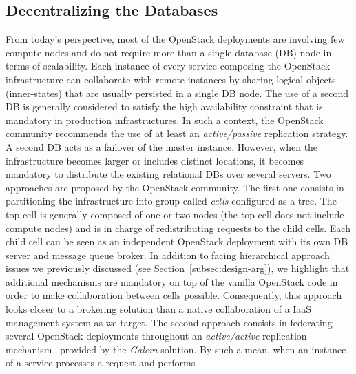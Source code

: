 \subsection{Decentralizing the Databases}


From today's perspective, most of the OpenStack deployments are involving few compute nodes and do not require more than a single database (DB) node
in terms of scalability. Each instance of every service composing the OpenStack infrastructure can collaborate with remote instances by sharing
logical objects (inner-states) that are usually persisted in a single DB node.
The use of a second DB is generally considered to satisfy the high availability constraint that is mandatory in production infrastructures. In such a
context, the OpenStack community recommends the use of at least an \textit{active/passive} replication strategy. A second DB acts as a failover of the
master instance. However, when the infrastructure becomes larger or includes distinct locations, it becomes mandatory to distribute the existing
relational DBs over several servers.%
Two approaches are proposed by the OpenStack community.
%
The first one consists in partitioning the infrastructure into group called \emph{cells} configured as a tree. The top-cell is generally composed of
one or two nodes (\ie the top-cell does not include compute nodes) and is in charge of redistributing requests to the child cells. Each child cell can
be seen as an independent OpenStack deployment with its own DB server and message queue broker. In addition to facing hierarchical approach issues we
previously discussed (see Section~\ref{subsec:design-arg}), we highlight that additional mechanisms are mandatory on top of the vanilla OpenStack code
in order to make collaboration between cells possible. Consequently, this approach looks closer to a brokering solution than a native collaboration of
a IaaS management system as we target.
The second approach consists in federating several OpenStack deployments throughout an \textit{active/active} replication
mechanism~\cite{kemme:vldb2010} provided by the \emph{Galera} solution. By such a mean, when an instance of a service processes a request and performs
